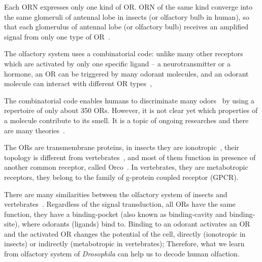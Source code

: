 \documentclass[11pt]{paper} %
\begin{document}
Each ORN expresses only one kind of OR. 
ORN of the same kind converge into the same glomeruli of antennal lobe in insects (or olfactory bulb in human), 
so that each glomerulus of antennal lobe (or olfactory bulb) receives an amplified signal from only one type of OR~\cite{root2007,Carey2011,Vosshall2000,Couto2005,fishilevich2005,gao2000,wang1998,mombaerts1996,vassar1994}.

The olfactory system uses a combinatorial code: 
unlike many other receptors which are activated by only one specific ligand -- a neurotransmitter or a hormone,
an OR can be triggered by many odorant molecules, 
and an odorant molecule can interact with different OR types~\cite{Malnic2000},

The combinatorial code enables humans to discriminate many odors~\cite{Bushdid2014} by using a repertoire of only about 350 ORs.
However, it is not clear yet which properties of a molecule contribute to its smell. 
It is a topic of ongoing researches and there are many theories~\cite{Turin,Keller2004,Araneda2000,Brookes2007,Franco2011,Pelz2006,Gabler2013,Schmuker2007,Haddad2008,Snitz2013,Yablonka2012,gane2013}.

The ORs are transmembrane proteins, 
in insects they are ionotropic~\cite{Sato2008,Wicher2008,Nagel2011,Rong2011}, 
their topology is different from vertebrates~\cite{Benton2006,Smart2008},
and most of them function in presence of another common receptor, called Orco~\cite{Larsson2004}.
In vertebrates, they are metabotropic receptors, they belong to the family of g-protein coupled receptor (GPCR). 

There are many similarities between the olfactory system of insects and vertebrates~\cite{Wilson2014,Kaupp2010}.
Regardless of the signal transduction, 
all ORs have the same function, they have a binding-pocket (also known as binding-cavity and binding-site),
where odorants (ligands) bind to. 
Binding to an odorant activates an OR and 
the activated OR changes the potential of the cell, 
directly (ionotropic in insects) or indirectly (metabotropic in vertebrates);
Therefore, what we learn from olfactory system of \textit{Drosophila} can help us to decode human olfaction. 
\end{document}
